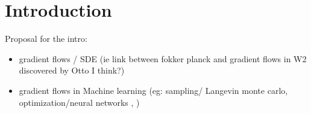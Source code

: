 

\section{Introduction}


Proposal for the intro:
\begin{itemize}
	\item gradient flows / SDE (ie link between fokker planck and gradient flows in W2 discovered by Otto I think?)
	\item gradient flows in Machine learning (eg: sampling/ Langevin monte carlo,  optimization/neural networks \cite{chizat2018global}, \cite{rotskoff2019global})
\end{itemize}

